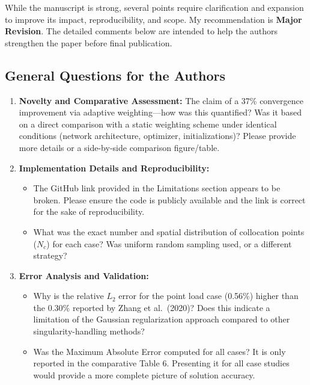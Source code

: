\documentclass[11pt]{article}
\begin{document}
While the manuscript is strong, several points require clarification and expansion to improve its impact, reproducibility, and scope. My recommendation is \textbf{Major Revision}. The detailed comments below are intended to help the authors strengthen the paper before final publication.

\subsection*{General Questions for the Authors}
\begin{enumerate}[label=Q\arabic*.]
    \item \textbf{Novelty and Comparative Assessment:} The claim of a 37\% convergence improvement via adaptive weighting—how was this quantified? Was it based on a direct comparison with a static weighting scheme under identical conditions (network architecture, optimizer, initializations)? Please provide more details or a side-by-side comparison figure/table.
    
    \item \textbf{Implementation Details and Reproducibility:}
    \begin{itemize}
        \item The GitHub link provided in the Limitations section appears to be broken. Please ensure the code is publicly available and the link is correct for the sake of reproducibility.
        \item What was the exact number and spatial distribution of collocation points ($N_c$) for each case? Was uniform random sampling used, or a different strategy?
    \end{itemize}
    
    \item \textbf{Error Analysis and Validation:}
    \begin{itemize}
        \item Why is the relative $L_2$ error for the point load case (0.56\%) higher than the 0.30\% reported by Zhang et al.\ (2020)? Does this indicate a limitation of the Gaussian regularization approach compared to other singularity-handling methods?
        \item Was the Maximum Absolute Error computed for all cases? It is only reported in the comparative Table 6. Presenting it for all case studies would provide a more complete picture of solution accuracy.
    \end{itemize}
    

\end{enumerate}
\end{document}
